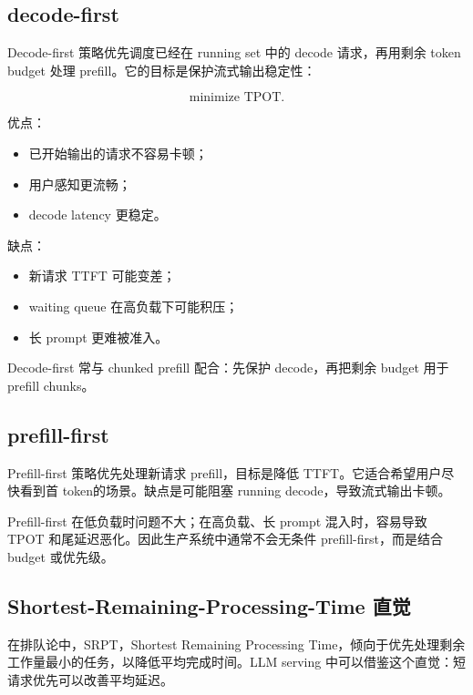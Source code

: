 \subsection{decode-first}
\label{subsec:decode-first-scheduling}

Decode-first 策略优先调度已经在 running set 中的 decode 请求，再用剩余 token budget 处理 prefill。它的目标是保护流式输出稳定性：

\[
\text{minimize TPOT}.
\]

优点：

\begin{itemize}
\item 已开始输出的请求不容易卡顿；
\item 用户感知更流畅；
\item decode latency 更稳定。
\end{itemize}

缺点：

\begin{itemize}
\item 新请求 TTFT 可能变差；
\item waiting queue 在高负载下可能积压；
\item 长 prompt 更难被准入。
\end{itemize}

Decode-first 常与 chunked prefill 配合：先保护 decode，再把剩余 budget 用于 prefill chunks。

\subsection{prefill-first}
\label{subsec:prefill-first-scheduling}

Prefill-first 策略优先处理新请求 prefill，目标是降低 TTFT。它适合希望用户尽快看到首 token的场景。缺点是可能阻塞 running decode，导致流式输出卡顿。

Prefill-first 在低负载时问题不大；在高负载、长 prompt 混入时，容易导致 TPOT 和尾延迟恶化。因此生产系统中通常不会无条件 prefill-first，而是结合 budget 或优先级。

\subsection{Shortest-Remaining-Processing-Time 直觉}
\label{subsec:srpt-intuition}

在排队论中，SRPT，Shortest Remaining Processing Time，倾向于优先处理剩余工作量最小的任务，以降低平均完成时间。LLM serving 中可以借鉴这个直觉：短请求优先可以改善平均延迟。

